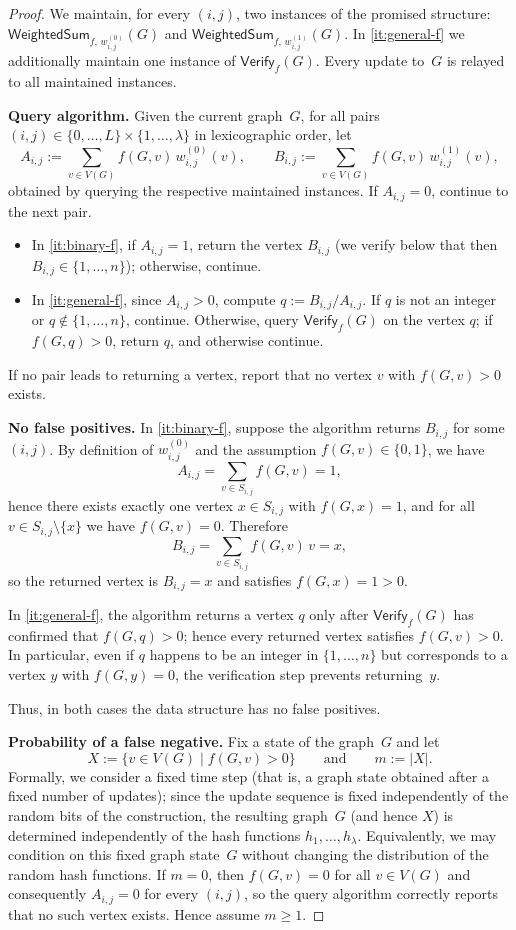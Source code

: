 \begin{proof}
We maintain, for every $(i,j)$, two instances of the promised structure:
$\mathsf{WeightedSum}_{f,\,w^{(0)}_{i,j}}(G)$ and
$\mathsf{WeightedSum}_{f,\,w^{(1)}_{i,j}}(G)$.
In \cref{it:general-f} we additionally maintain one instance of
$\mathsf{Verify}_{f}(G)$.
Every update to~$G$ is relayed to all maintained instances.

\smallskip
\noindent\textbf{Query algorithm.}
Given the current graph~$G$, for all pairs
$(i,j)\in\{0,\dots,L\}\times\{1,\dots,\lambda\}$ in lexicographic order, let
\[
A_{i,j} := \sum_{v\in V(G)} f(G,v)\,w^{(0)}_{i,j}(v),
\qquad
B_{i,j} := \sum_{v\in V(G)} f(G,v)\,w^{(1)}_{i,j}(v),
\]
obtained by querying the respective maintained instances.
If $A_{i,j}=0$, continue to the next pair.
\begin{itemize}
\item In \cref{it:binary-f}, if $A_{i,j}=1$, return the vertex
$B_{i,j}$ (we verify below that then $B_{i,j}\in\{1,\dots,n\}$); otherwise,
continue.
\item In \cref{it:general-f}, since $A_{i,j}>0$, compute $q := B_{i,j}/A_{i,j}$.
If $q$ is not an integer or $q\notin\{1,\dots,n\}$, continue.
Otherwise, query $\mathsf{Verify}_f(G)$ on the vertex $q$;
if $f(G,q)>0$, return $q$, and otherwise continue.
\end{itemize}
If no pair leads to returning a vertex, report that no vertex $v$ with
$f(G,v)>0$ exists.

\smallskip
\noindent\textbf{No false positives.}
In \cref{it:binary-f}, suppose the algorithm returns $B_{i,j}$ for
some $(i,j)$.
By definition of $w^{(0)}_{i,j}$ and the assumption
$f(G,v)\in\{0,1\}$, we have
\[
A_{i,j}=\sum_{v\in S_{i,j}} f(G,v)=1,
\]
hence there exists exactly one vertex $x\in S_{i,j}$ with $f(G,x)=1$, and
for all $v\in S_{i,j}\setminus\{x\}$ we have $f(G,v)=0$.
Therefore
\[
B_{i,j}=\sum_{v\in S_{i,j}} f(G,v)\,v=x,
\]
so the returned vertex is $B_{i,j}=x$ and satisfies
$f(G,x)=1>0$.

In \cref{it:general-f}, the algorithm returns a vertex $q$ only after
$\mathsf{Verify}_f(G)$ has confirmed that $f(G,q)>0$; hence every
returned vertex satisfies $f(G,v)>0$. In particular, even if $q$ happens to be
an integer in $\{1,\dots,n\}$ but corresponds to a vertex $y$ with $f(G,y)=0$,
the verification step prevents returning~$y$.

Thus, in both cases the data structure has no false positives.

\smallskip
\noindent\textbf{Probability of a false negative.}
Fix a state of the graph~$G$ and let
\[
X := \{v\in V(G)\mid f(G,v)>0\}
\qquad\text{and}\qquad
m := |X|.
\]
Formally, we consider a fixed time step (that is, a graph state obtained after
a fixed number of updates); since the update sequence is fixed independently of
the random bits of the construction, the resulting graph~$G$ (and hence $X$)
is determined independently of the hash functions $h_1,\dots,h_\lambda$.
Equivalently, we may condition on this fixed graph state~$G$ without changing
the distribution of the random hash functions.
If $m=0$, then $f(G,v)=0$ for all $v\in V(G)$ and consequently $A_{i,j}=0$ for
every $(i,j)$, so the query algorithm correctly reports that no such vertex
exists. Hence assume $m\ge 1$.


\end{proof}
